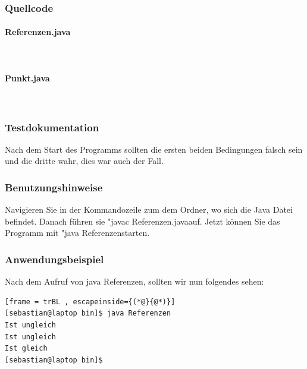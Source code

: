 \subsubsection{Quellcode}
\paragraph{Referenzen.java}\

\paragraph{Punkt.java}\


\subsubsection{Testdokumentation}
Nach dem Start des Programms sollten die ersten beiden Bedingungen falsch sein und die dritte wahr, dies war auch der Fall.

\subsubsection{Benutzungshinweise}
Navigieren Sie in der Kommandozeile zum dem Ordner, wo sich die Java Datei befindet.
Danach führen sie "javac Referenzen.java\dq \space auf. Jetzt können Sie das Programm mit
"java Referenzen\dq \space starten.

\subsubsection{Anwendungsbeispiel}
Nach dem Aufruf von java Referenzen, sollten wir nun folgendes sehen:
\begin{lstlisting}[frame = trBL , escapeinside={(*@}{@*)}]
[sebastian@laptop bin]$ java Referenzen 
Ist ungleich
Ist ungleich
Ist gleich
[sebastian@laptop bin]$  
\end{lstlisting}
